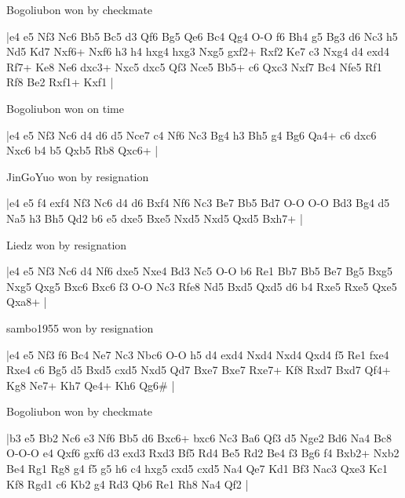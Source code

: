 \showboard

Bogoliubon won by checkmate

\makegametitle
|e4 e5 Nf3 Nc6 Bb5 Bc5 d3 Qf6 Bg5 Qe6 Bc4 Qg4 O-O f6 Bh4 g5 Bg3 d6 Nc3 h5 Nd5 Kd7 Nxf6+ Nxf6 h3 h4 hxg4 hxg3 Nxg5 gxf2+ Rxf2 Ke7 c3 Nxg4 d4 exd4 Rf7+ Ke8 Ne6 dxc3+ Nxc5 dxc5 Qf3 Nce5 Bb5+ c6 Qxc3 Nxf7 Bc4 Nfe5 Rf1 Rf8 Be2 Rxf1+ Kxf1  |

\showboard

Bogoliubon won on time

\makegametitle
|e4 e5 Nf3 Nc6 d4 d6 d5 Nce7 c4 Nf6 Nc3 Bg4 h3 Bh5 g4 Bg6 Qa4+ c6 dxc6 Nxc6 b4 b5 Qxb5 Rb8 Qxc6+  |

\showboard

JinGoYuo won by resignation

\makegametitle
|e4 e5 f4 exf4 Nf3 Nc6 d4 d6 Bxf4 Nf6 Nc3 Be7 Bb5 Bd7 O-O O-O Bd3 Bg4 d5 Na5 h3 Bh5 Qd2 b6 e5 dxe5 Bxe5 Nxd5 Nxd5 Qxd5 Bxh7+  |

\showboard

Liedz won by resignation

\makegametitle
|e4 e5 Nf3 Nc6 d4 Nf6 dxe5 Nxe4 Bd3 Nc5 O-O b6 Re1 Bb7 Bb5 Be7 Bg5 Bxg5 Nxg5 Qxg5 Bxc6 Bxc6 f3 O-O Nc3 Rfe8 Nd5 Bxd5 Qxd5 d6 b4 Rxe5 Rxe5 Qxe5 Qxa8+  |

\showboard

sambo1955 won by resignation

\makegametitle
|e4 e5 Nf3 f6 Bc4 Ne7 Nc3 Nbc6 O-O h5 d4 exd4 Nxd4 Nxd4 Qxd4 f5 Re1 fxe4 Rxe4 c6 Bg5 d5 Bxd5 cxd5 Nxd5 Qd7 Bxe7 Bxe7 Rxe7+ Kf8 Rxd7 Bxd7 Qf4+ Kg8 Ne7+ Kh7 Qe4+ Kh6 Qg6\#  |

\showboard

Bogoliubon won by checkmate

\makegametitle
|b3 e5 Bb2 Nc6 e3 Nf6 Bb5 d6 Bxc6+ bxc6 Nc3 Ba6 Qf3 d5 Nge2 Bd6 Na4 Bc8 O-O-O e4 Qxf6 gxf6 d3 exd3 Rxd3 Bf5 Rd4 Be5 Rd2 Be4 f3 Bg6 f4 Bxb2+ Nxb2 Be4 Rg1 Rg8 g4 f5 g5 h6 c4 hxg5 cxd5 cxd5 Na4 Qe7 Kd1 Bf3 Nac3 Qxe3 Kc1 Kf8 Rgd1 c6 Kb2 g4 Rd3 Qb6 Re1 Rh8 Na4 Qf2  |

